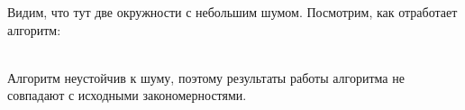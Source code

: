 \documentclass[12pt,twoside]{article}
\begin{document}
Видим, что тут две окружности с небольшим шумом. Посмотрим, как отработает алгоритм: \\
\begin{figure}[h]
\end{figure} \\
Алгоритм неустойчив к шуму, поэтому результаты работы алгоритма не совпадают с исходными закономерностями. 
\end{document}
